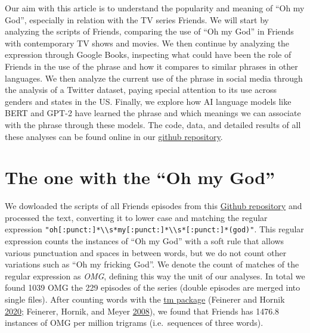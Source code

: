 \documentclass[]{article}
\begin{document}
Our aim with this article is to understand the popularity and meaning of ``Oh my God'', especially in relation with the TV series Friends. We will start by analyzing the scripts of Friends, comparing the use of ``Oh my God'' in Friends with contemporary TV shows and movies. We then continue by analyzing the expression through Google Books, inspecting what could have been the role of Friends in the use of the phrase and how it compares to similar phrases in other languages. We then analyze the current use of the phrase in social media through the analysis of a Twitter dataset, paying special attention to its use across genders and states in the US. Finally, we explore how AI language models like BERT and GPT-2 have learned the phrase and which meanings we can associate with the phrase through these models. The code, data, and detailed results of all these analyses can be found online in our \href{https://github.com/dgarcia-eu/Friends_HPS2020}{github repository}.

\hypertarget{the-one-with-the-oh-my-god}{%
\section{The one with the ``Oh my God''}\label{the-one-with-the-oh-my-god}}

We dowloaded the scripts of all Friends episodes from this \href{https://github.com/fangj/friends}{Github repository} and processed the text, converting it to lower case and matching the regular expression \texttt{"oh{[}:punct:{]}*\textbackslash{}\textbackslash{}s*my{[}:punct:{]}*\textbackslash{}\textbackslash{}s*{[}:punct:{]}*(god)"}. This regular expression counts the instances of ``Oh my God'' with a soft rule that allows various punctuation and spaces in between words, but we do not count other variations such as ``Oh my fricking God''. We denote the count of matches of the regular expression as \emph{OMG}, defining this way the unit of our analyses. In total we found 1039 OMG the 229 episodes of the series (double episodes are merged into single files). After counting words with the \href{https://cran.r-project.org/web/packages/tm/index.html}{tm package} (Feinerer and Hornik \protect\hyperlink{ref-tm1}{2020}; Feinerer, Hornik, and Meyer \protect\hyperlink{ref-tm2}{2008}), we found that Friends has 1476.8 instances of OMG per million trigrams (i.e.~sequences of three words).
\end{document}
